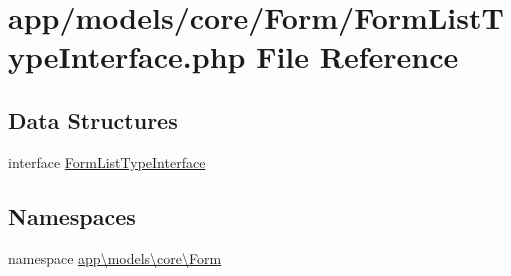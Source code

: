 \hypertarget{_form_list_type_interface_8php}{\section{app/models/core/\-Form/\-Form\-List\-Type\-Interface.php File Reference}
\label{_form_list_type_interface_8php}
}
\subsection*{Data Structures}
\begin{DoxyCompactItemize}
\item 
interface \hyperlink{interfaceapp_1_1models_1_1core_1_1_form_1_1_form_list_type_interface}{Form\-List\-Type\-Interface}
\end{DoxyCompactItemize}
\subsection*{Namespaces}
\begin{DoxyCompactItemize}
\item 
namespace \hyperlink{namespaceapp_1_1models_1_1core_1_1_form}{app\textbackslash{}models\textbackslash{}core\textbackslash{}\-Form}
\end{DoxyCompactItemize}
